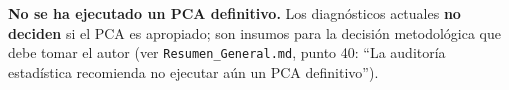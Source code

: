 \textbf{No se ha ejecutado un PCA definitivo.} Los diagnósticos actuales \textbf{no deciden} si el PCA es apropiado; son insumos para la decisión metodológica que debe tomar el autor (ver \texttt{Resumen\_General.md}, punto 40: ``La auditoría estadística recomienda no ejecutar aún un PCA definitivo'').
